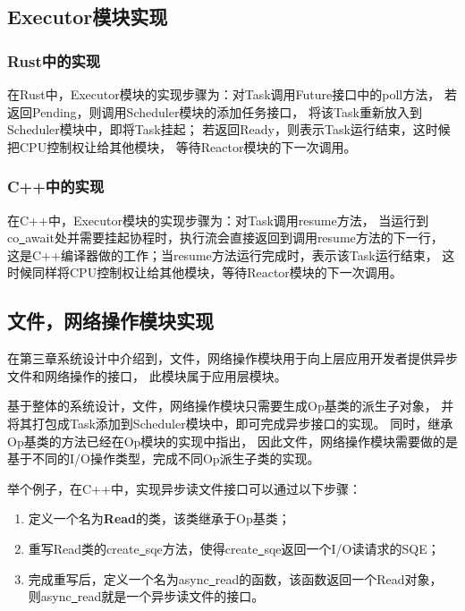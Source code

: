 \documentclass[supercite]{HustGraduPaper}
\theoremstyle{definition}
\begin{document}
\subsection{Executor模块实现}

\subsubsection{Rust中的实现}

在Rust中，Executor模块的实现步骤为：对Task调用Future接口中的poll方法，
若返回Pending，则调用Scheduler模块的添加任务接口，
将该Task重新放入到Scheduler模块中，即将Task挂起；
若返回Ready，则表示Task运行结束，这时候把CPU控制权让给其他模块，
等待Reactor模块的下一次调用。\par

\subsubsection{C++中的实现}

在C++中，Executor模块的实现步骤为：对Task调用resume方法，
当运行到co\underline{~}await处并需要挂起协程时，执行流会直接返回到调用resume方法的下一行，
这是C++编译器做的工作；当resume方法运行完成时，表示该Task运行结束，
这时候同样将CPU控制权让给其他模块，等待Reactor模块的下一次调用。\par

\subsection{文件，网络操作模块实现}

在第三章系统设计中介绍到，文件，网络操作模块用于向上层应用开发者提供异步文件和网络操作的接口，
此模块属于应用层模块。\par

基于整体的系统设计，文件，网络操作模块只需要生成Op基类的派生子对象，
并将其打包成Task添加到Scheduler模块中，即可完成异步接口的实现。
同时，继承Op基类的方法已经在Op模块的实现中指出，
因此文件，网络操作模块需要做的是基于不同的I/O操作类型，完成不同Op派生子类的实现。\par

举个例子，在C++中，实现异步读文件接口可以通过以下步骤：

\begin{enumerate}
  \item 定义一个名为\textbf{Read}的类，该类继承于Op基类；
  \item 重写Read类的create\underline{~}sqe方法，使得create\underline{~}sqe返回一个I/O读请求的SQE；
  \item 完成重写后，定义一个名为async\underline{~}read的函数，该函数返回一个Read对象，
    则async\underline{~}read就是一个异步读文件的接口。
\end{enumerate}
\end{document}
